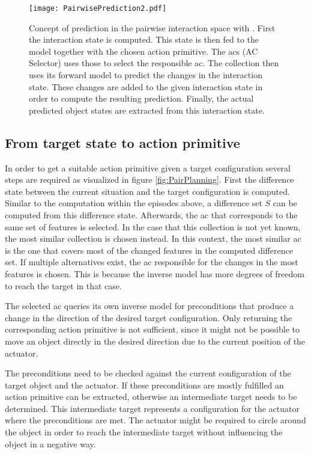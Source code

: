 \begin{figure}
	\centering
	\texttt{[image: PairwisePrediction2.pdf]}
	\caption{Concept of prediction in the pairwise interaction space with . First the interaction state is computed. This state is then fed to the model together with the chosen action primitive. The \acrlong{acs} (AC Selector) uses those to select the responsible \gls{ac}. The collection then uses its forward model to predict the changes in the interaction state. These changes are added to the given interaction state in order to compute the resulting prediction. Finally, the actual predicted object states are extracted from this interaction state.} 
	\label{fig:PairPrediction}
\end{figure}

\subsection{From target state to action primitive \label{sec:pairPlanning}}

In order to get a suitable action primitive given a target configuration several steps are required as visualized in figure \ref{fig:PairPlanning}. 
First the difference state between the current situation and the target configuration is computed. Similar to the computation within the episodes above, a difference set $S$ can be computed from this difference state. Afterwards, the \gls{ac} that corresponds to the same set of features is selected. In the case that this collection is not yet known, the most similar collection is chosen instead. In this context, the most similar \gls{ac} is the one that covers most of the changed features in the computed difference set. If multiple alternatives exist, the \gls{ac} responsible for the changes in the most features is chosen. This is because the inverse model has more degrees of freedom to reach the target in that case.

The selected \gls{ac} queries its own inverse model for preconditions that produce a change in the direction of the desired target configuration. 
Only returning the corresponding action primitive is not sufficient, since it might not be possible to move an object directly in the desired direction due to the current position of the actuator.

The preconditions need to be checked against the current configuration of the target object and the actuator. If these preconditions are mostly fulfilled an action primitive can be extracted, otherwise an intermediate target needs to be determined. This intermediate target represents a configuration for the actuator where the preconditions are met. The actuator might be required to circle around the object in order to reach the intermediate target without influencing the object in a negative way.


